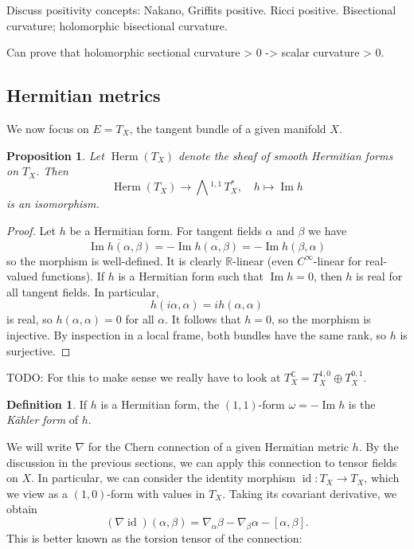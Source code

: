 \documentclass[11pt]{article}
\newtheorem{prop}[theo]{Proposition}
\theoremstyle{definition}
\newtheorem{defi}[theo]{Definition}
\newcommand{\kk}[1]{\mathbb{#1}}
\DeclareMathOperator{\im}{Im}
\DeclareMathOperator{\id}{id}
\newcommand{\ext}[1]{\bigwedge{}^{\!\!#1}\,}
\begin{document}
Discuss positivity concepts: Nakano, Griffits positive. Ricci positive. Bisectional curvature; holomorphic bisectional curvature.

Can prove that holomorphic sectional curvature > 0 -> scalar curvature > 0.



\subsection{Hermitian metrics}

We now focus on $E = T_X$, the tangent bundle of a given manifold $X$.


\begin{prop}
Let $\operatorname{Herm}(T_X)$ denote the sheaf of smooth Hermitian forms on $T_X$. Then
$$
\operatorname{Herm}(T_X) \to \ext{1,1} T_X^*,
\quad
h \mapsto \im h
$$
is an isomorphism.
\end{prop}

\begin{proof}
Let $h$ be a Hermitian form. For tangent fields $\alpha$ and $\beta$ we have
$$
\overline{\im h(\alpha,\beta)}
= -\im \overline{h(\alpha, \beta)}
= -\im h(\beta, \alpha)
$$
so the morphism is well-defined. It is clearly $\kk R$-linear (even $C^\infty$-linear for real-valued functions). If $h$ is a Hermitian form such that $\im h = 0$, then $h$ is real for all tangent fields. In particular,
$$
h(i\alpha, \alpha) = i h(\alpha,\alpha)
$$
is real, so $h(\alpha,\alpha) = 0$ for all $\alpha$. It follows that $h = 0$, so the morphism is injective. By inspection in a local frame, both bundles have the same rank, so $h$ is surjective.
\end{proof}

TODO: For this to make sense we really have to look at $T_X^{\kk C} = T_X^{1,0} \oplus T_X^{0,1}$.

\begin{defi}
If $h$ is a Hermitian form, the $(1,1)$-form $\omega = -\im h$ is the \emph{K\"ahler form} of $h$.
\end{defi}


We will write $\nabla$ for the Chern connection of a given Hermitian metric $h$. By the discussion in the previous sections, we can apply this connection to tensor fields on $X$. In particular, we can consider the identity morphism $\id : T_X \to T_X$, which we view as a $(1,0)$-form with values in $T_X$. Taking its covariant derivative, we obtain
$$
(\nabla \id)(\alpha, \beta)
= \nabla_\alpha \beta - \nabla_\beta \alpha - [\alpha, \beta].
$$
This is better known as the torsion tensor of the connection:
\end{document}
